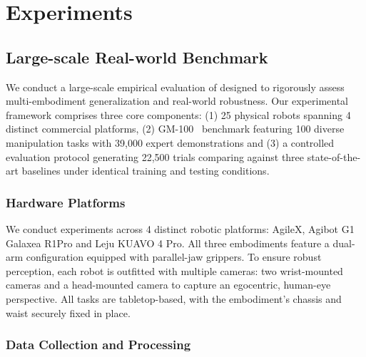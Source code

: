 \section{Experiments}\label{sec:exp}

\subsection{Large-scale Real-world Benchmark}
We conduct a large-scale empirical evaluation of \method designed to rigorously assess multi-embodiment generalization and real-world robustness. Our experimental framework comprises three core components: (1) 25 physical robots spanning 4 distinct commercial platforms, (2) GM-100~\cite{gm100} benchmark featuring 100 diverse manipulation tasks with 39,000 expert demonstrations 
and (3) a controlled evaluation protocol generating 22,500 trials 
comparing \method against three state-of-the-art baselines under identical training and testing conditions.

\subsubsection{Hardware Platforms}
We conduct experiments across 4 distinct robotic platforms: AgileX, Agibot G1 Galaxea R1Pro and Leju KUAVO 4 Pro. 
All three embodiments feature a dual-arm configuration equipped with parallel-jaw grippers.
To ensure robust perception, each robot is outfitted with multiple cameras: two wrist-mounted cameras and a head-mounted camera to capture an egocentric, human-eye perspective. 
All tasks are tabletop-based, with the embodiment's chassis and waist securely fixed in place.


\subsubsection{Data Collection and Processing}

